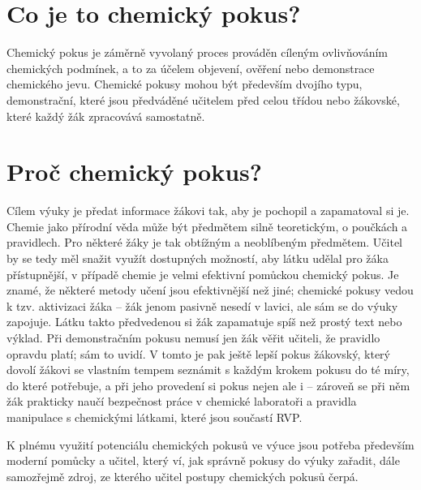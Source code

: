 
\section{Co je to chemický pokus?}
Chemický pokus je záměrně vyvolaný proces prováděn cíleným ovlivňováním chemických podmínek, a to za účelem objevení, ověření nebo demonstrace chemického jevu. \cite{badani} Chemické pokusy mohou být především dvojího typu, demonstrační, které jsou předváděné učitelem před celou třídou nebo žákovské, které každý žák zpracovává samostatně.

\section{Proč chemický pokus?}
Cílem výuky je předat informace žákovi tak, aby je pochopil a zapamatoval si je. Chemie jako přírodní věda může být předmětem silně teoretickým, o poučkách a pravidlech. Pro některé žáky je tak obtížným a neoblíbeným předmětem.\cite{oblibenost} Učitel by se tedy měl snažit využít dostupných možností, aby látku udělal pro žáka přístupnější, v případě chemie je velmi efektivní pomůckou chemický pokus. Je znamé, že některé metody učení jsou efektivnější než jiné; chemické pokusy vedou k tzv. aktivizaci žáka -- žák jenom pasivně nesedí v lavici, ale sám se do výuky zapojuje. Látku takto předvedenou si žák zapamatuje spíš než prostý text nebo výklad.\cite{badani} Při demonstračním pokusu nemusí jen žák věřit učiteli, že pravidlo opravdu platí; sám to uvidí. V tomto je pak ještě lepší pokus žákovský, který dovolí žákovi se vlastním tempem seznámit s každým krokem pokusu do té míry, do které potřebuje, a při jeho provedení si pokus nejen  ale i  -- zároveň se při něm žák prakticky naučí bezpečnost práce v chemické laboratoři a pravidla manipulace s chemickými látkami, které jsou součastí RVP.

K plnému využití potenciálu chemických pokusů ve výuce jsou potřeba především moderní pomůcky a učitel, který ví, jak správně pokusy do výuky zařadit, dále samozřejmě zdroj, ze kterého učitel postupy chemických pokusů čerpá.
